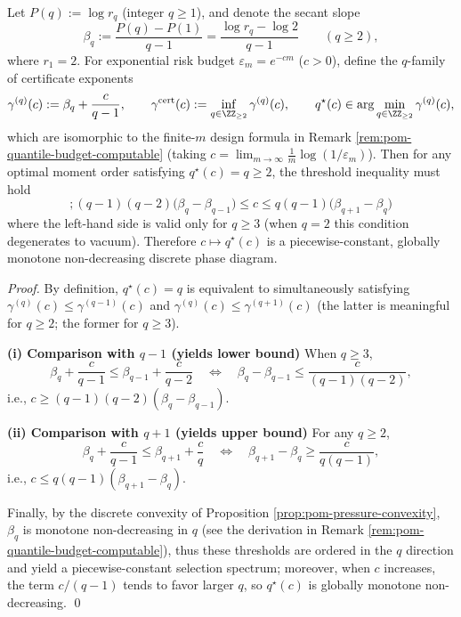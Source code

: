 \begin{proposition}\label{prop:pom-qstar-discrete-variational-threshold}
Let \(P(q):=\log r_q\) (integer \(q\ge 1\)), and denote the secant slope
\[
\beta_q:=\frac{P(q)-P(1)}{q-1}
=\frac{\log r_q-\log 2}{q-1}
\qquad(q\ge 2),
\]
where \(r_1=2\).
For exponential risk budget \(\varepsilon_m=e^{-cm}\) (\(c>0\)), define the \(q\)-family of certificate exponents
\[
\gamma^{(q)}(c):=\beta_q+\frac{c}{q-1},
\qquad
\gamma^{\mathrm{cert}}(c):=\inf_{q\in\ZZ_{\ge 2}}\gamma^{(q)}(c),
\qquad
q^\star(c)\in\arg\min_{q\in\ZZ_{\ge 2}}\gamma^{(q)}(c),
\]
which are isomorphic to the finite-\(m\) design formula in Remark \ref{rem:pom-quantile-budget-computable} (taking \(c=\lim_{m\to\infty}\frac1m\log(1/\varepsilon_m)\)).
Then for any optimal moment order satisfying \(q^\star(c)=q\ge 2\), the threshold inequality must hold
\[
\boxed{\ ;
(q-1)(q-2)\bigl(\beta_q-\beta_{q-1}\bigr)\le c\le q(q-1)\bigl(\beta_{q+1}-\beta_{q}\bigr)\;}
\]
where the left-hand side is valid only for \(q\ge 3\) (when \(q=2\) this condition degenerates to vacuum).
Therefore \(c\mapsto q^\star(c)\) is a piecewise-constant, globally monotone non-decreasing discrete phase diagram.
\end{proposition}
\begin{proof}
By definition, \(q^\star(c)=q\) is equivalent to simultaneously satisfying
\(
\gamma^{(q)}(c)\le \gamma^{(q-1)}(c)
\)
and
\(
\gamma^{(q)}(c)\le \gamma^{(q+1)}(c)
\)
(the latter is meaningful for \(q\ge 2\); the former for \(q\ge 3\)).

\smallskip\noindent\textbf{(i) Comparison with \(q-1\) (yields lower bound)}
When \(q\ge 3\),
\[
\beta_q+\frac{c}{q-1}\le \beta_{q-1}+\frac{c}{q-2}
\quad\Longleftrightarrow\quad
\beta_q-\beta_{q-1}\le \frac{c}{(q-1)(q-2)},
\]
i.e., \(c\ge (q-1)(q-2)(\beta_q-\beta_{q-1})\).

\smallskip\noindent\textbf{(ii) Comparison with \(q+1\) (yields upper bound)}
For any \(q\ge 2\),
\[
\beta_q+\frac{c}{q-1}\le \beta_{q+1}+\frac{c}{q}
\quad\Longleftrightarrow\quad
\beta_{q+1}-\beta_q\ge \frac{c}{q(q-1)},
\]
i.e., \(c\le q(q-1)(\beta_{q+1}-\beta_q)\).

\smallskip
Finally, by the discrete convexity of Proposition \ref{prop:pom-pressure-convexity}, \(\beta_q\) is monotone non-decreasing in \(q\) (see the derivation in Remark \ref{rem:pom-quantile-budget-computable}),
thus these thresholds are ordered in the \(q\) direction and yield a piecewise-constant selection spectrum; moreover, when \(c\) increases, the term \(c/(q-1)\) tends to favor larger \(q\), so \(q^\star(c)\) is globally monotone non-decreasing. \qed
\end{proof}

\endinput



